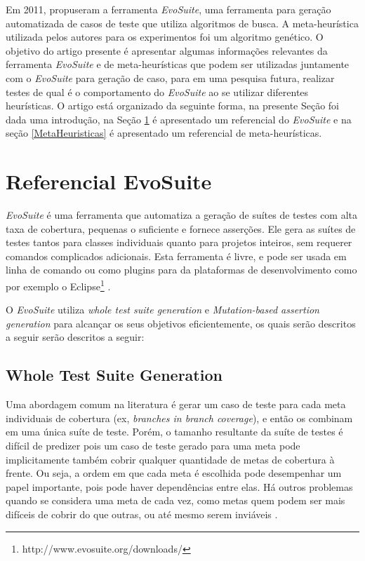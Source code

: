 \documentclass[conference]{IEEEtran}
\begin{document}
    

Em 2011, \cite{fraser2011evosuite} propuseram a ferramenta \emph{EvoSuite}, uma ferramenta para geração automatizada de casos de teste que utiliza algoritmos de busca. A meta-heurística utilizada pelos autores para os experimentos foi um algoritmo genético. O objetivo do artigo presente é apresentar algumas informações relevantes da ferramenta \emph{EvoSuite} e de meta-heurísticas que podem ser utilizadas juntamente com o \emph{EvoSuite} para geração de caso, para em uma pesquisa futura, realizar testes de qual é o comportamento do \emph{EvoSuite} ao se utilizar diferentes heurísticas. O artigo está organizado da seguinte forma, na presente Seção foi dada uma introdução, na Seção \ref{ReferencialEvoSuite} é apresentado um referencial do \emph{EvoSuite} e na seção \ref{MetaHeuristicas} é apresentado um referencial de meta-heurísticas.


\section{Referencial EvoSuite} \label{ReferencialEvoSuite}

\textit{EvoSuite} é uma ferramenta que automatiza a geração de suítes de testes com alta taxa de cobertura, pequenas o suficiente e fornece asserções. Ele gera as suítes de testes tantos para classes individuais quanto para projetos inteiros, sem requerer comandos complicados adicionais. Esta ferramenta é livre, e pode ser usada em linha de comando ou como  plugins para da plataformas de desenvolvimento como por exemplo o Eclipse\footnote{http://www.evosuite.org/downloads/} \cite{fraser2011evosuite}.

O \textit{EvoSuite} utiliza \textit{whole test suite generation} e \textit{Mutation-based assertion generation} para alcançar os seus objetivos eficientemente, os quais serão descritos a seguir serão descritos a seguir:

\subsection{Whole Test Suite Generation}

Uma abordagem comum na literatura é gerar um caso de teste para cada meta individuais de cobertura (ex, \textit{branches in branch coverage}), e então os combinam em uma única suíte de teste. Porém, o tamanho resultante da suíte de testes é difícil de predizer pois um caso de teste gerado para uma meta pode implicitamente também cobrir qualquer quantidade de metas de cobertura à frente. Ou seja, a ordem em que cada meta é escolhida pode desempenhar um papel importante, pois pode haver dependências entre elas. Há outros problemas quando se considera uma meta de cada vez, como metas quem podem ser mais difíceis de cobrir do que outras, ou até mesmo serem inviáveis \cite{fraser2013whole}.
\end{document}

